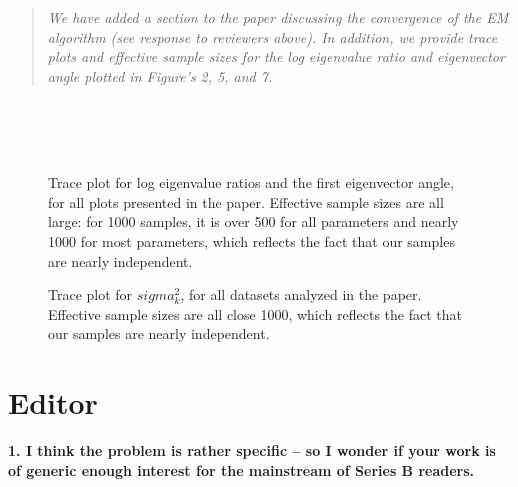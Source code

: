 \documentclass{article}
\newenvironment{resp}{\begin{quotation}\noindent\slshape}{\end{quotation}}
\begin{document}
\begin{resp}
We have added a section to the paper discussing the convergence of the EM algorithm (see response to reviewers above).  In addition, we provide trace plots and effective sample sizes for the log eigenvalue ratio and eigenvector angle plotted in Figure's 2, 5, and 7.  
\end{resp}


\begin{figure}[t]
    \centering
    \\
    \\
    \\
      \caption{Trace plot for log eigenvalue ratios and the first eigenvector angle, for all plots presented in the paper. Effective sample sizes are all large: for 1000 samples, it is over 500 for all parameters and nearly 1000 for most parameters, which reflects the fact that our samples are nearly independent.}
\label{fig:dimensionPlots}
\end{figure}

\begin{figure}[t]
    \centering
      \caption{Trace plot for $sigma^2_k$, for all datasets analyzed in the paper. Effective sample sizes are all close 1000, which reflects the fact that our samples are nearly independent.}
\label{fig:dimensionPlots}
\end{figure}


\section*{Editor}

\textbf{1. I think the problem is rather specific – so I wonder if your work is of generic enough interest for the mainstream of Series B readers.}
\end{document}
